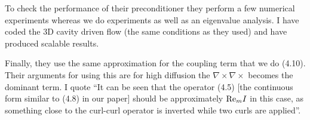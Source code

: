 \documentclass[11pt]{article}
\numberwithin{equation}{section}    %
\begin{document}
To check the performance of their preconditioner they perform a few numerical experiments whereas we do experiments as well as an eigenvalue analysis. I have coded the 3D cavity driven flow (the same conditions as they used) and have produced scalable results.

Finally, they use the same approximation for the coupling term that we do (4.10). Their arguments for using this are for high diffusion the $\nabla \times \nabla \times$ becomes the dominant term. I quote ``It can be seen that the operator (4.5) [the continuous form similar to (4.8) in our paper] should be approximately ${\rm Re}_m I$ in this case, as something close to the curl-curl operator is inverted while two curls are applied''.
\end{document}
